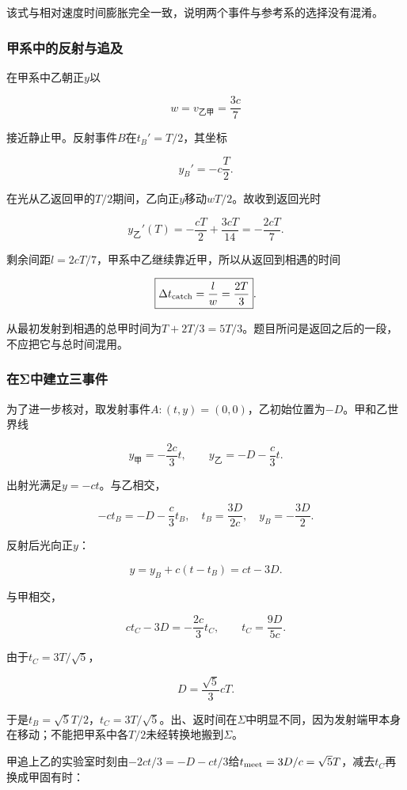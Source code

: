 \documentclass[12pt,a4paper,fontset=fandol]{ctexart}
\begin{document}
该式与相对速度时间膨胀完全一致，说明两个事件与参考系的选择没有混淆。

\subsubsection{甲系中的反射与追及}\label{ux7532ux7cfbux4e2dux7684ux53cdux5c04ux4e0eux8ffdux53ca}

在甲系中乙朝正\(y\)以

\[
w=v_{\text{乙}\text{甲}}=\frac{3c}{7}
\]

接近静止甲。反射事件\(B\)在\(t_B'=T/2\)，其坐标

\[
y_B'=-c\frac T2.
\]

在光从乙返回甲的\(T/2\)期间，乙向正\(y\)移动\(wT/2\)。故收到返回光时

\[
y_{\text{乙}}'(T)
=-\frac{cT}{2}+\frac{3cT}{14}
=-\frac{2cT}{7}.
\]

剩余间距\(l=2cT/7\)，甲系中乙继续靠近甲，所以从返回到相遇的时间

\[
\boxed{
\Delta t_{\rm catch}
=\frac{l}{w}
=\frac{2T}{3}}.
\]

从最初发射到相遇的总甲时间为\(T+2T/3=5T/3\)。题目所问是返回之后的一段，不应把它与总时间混用。

\subsubsection{在Σ中建立三事件}\label{ux5728ux3c3ux4e2dux5efaux7acbux4e09ux4e8bux4ef6}

为了进一步核对，取发射事件\(A:(t,y)=(0,0)\)，乙初始位置为\(-D\)。甲和乙世界线

\[
y_{\text{甲}}=-\frac{2c}{3}t,\qquad
y_{\text{乙}}=-D-\frac c3t.
\]

出射光满足\(y=-ct\)。与乙相交，

\[
-ct_B=-D-\frac c3t_B,
\quad
t_B=\frac{3D}{2c},\quad y_B=-\frac{3D}{2}.
\]

反射后光向正\(y\)：

\[
y=y_B+c(t-t_B)=ct-3D.
\]

与甲相交，

\[
ct_C-3D=-\frac{2c}{3}t_C,
\qquad
t_C=\frac{9D}{5c}.
\]

由于\(t_C=3T/\sqrt5\)，

\[
D=\frac{\sqrt5}{3}cT.
\]

于是\(t_B=\sqrt5T/2\)，\(t_C=3T/\sqrt5\)。出、返时间在\(\Sigma\)中明显不同，因为发射端甲本身在移动；不能把甲系中各\(T/2\)未经转换地搬到\(\Sigma\)。

甲追上乙的实验室时刻由\(-2ct/3=-D-ct/3\)给\(t_{\rm meet}=3D/c=\sqrt5T\)，减去\(t_C\)再换成甲固有时：
\end{document}
